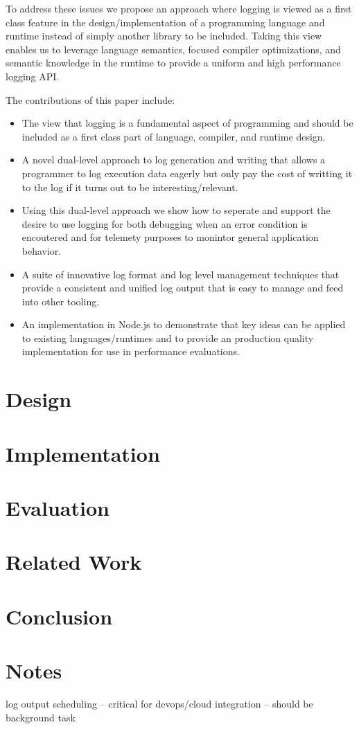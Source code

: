 \documentclass[sigplan,10pt,review]{acmart}
\begin{document}
To address these issues we propose an approach where logging is viewed as a first 
class feature in the design/implementation of a programming language and runtime 
instead of simply another library to be included. Taking this view enables us to 
leverage language semantics, focused compiler optimizations, and semantic knowledge 
in the runtime to provide a uniform and high performance logging API.

\noindent
The contributions of this paper include:
\begin{itemize}
\item The view that logging is a fundamental aspect of programming and should be
included as a first class part of language, compiler, and runtime design.

\item A novel dual-level approach to log generation and writing that allows a
programmer to log execution data eagerly but only pay the cost of writting it to
the log if it turns out to be interesting/relevant.

\item Using this dual-level approach we show how to seperate and support the 
desire to use logging for both debugging when an error condition is encoutered 
and for telemety purposes to monintor general application behavior. 

\item A suite of innovative log format and log level management techniques that 
provide a consistent and unified log output that is easy to manage and feed into 
other tooling.

\item An implementation in Node.js to demonstrate that key ideas can be applied 
to existing languages/runtimes and to provide an production quality implementation 
for use in performance evaluations.
\end{itemize}

\section{Design}
\label{sec:design}


\section{Implementation}
\label{sec:implementation}


\section{Evaluation}
\label{sec:evaluation}


\section{Related Work}
\label{sec:relwork}

\section{Conclusion}

\section{Notes} log output scheduling -- critical for devops/cloud integration
-- should be background task


\balance

{
\raggedright 

 
}
\end{document}
